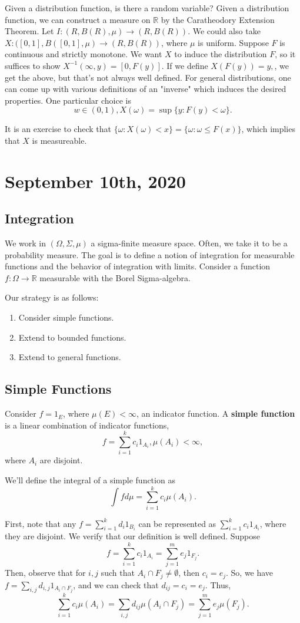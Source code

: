 \documentclass[11pt]{scrartcl}
\newcommand{\R}{\mathbb{R}}
\begin{document}
Given a distribution function, is there a random variable?  Given a distribution function, we can construct a measure on $\R$ by the Caratheodory Extension Theorem.  Let $I: (R, B(R), \mu) \rightarrow (R, B(R))$.  We could also take $X: ([0, 1], B([0, 1], \mu) \rightarrow (R, B(R))$, where $\mu$ is uniform.  Suppose $F$ is continuous and strictly monotone.  We want $X$ to induce the distribution $F$, so it suffices to show $X^{-1}(\infty, y) = [0, F(y)]$.  If we define $X(F(y)) = y,$, we get the above, but that's not always well defined.  For general distributions, one can come up with various definitions of an "inverse" which induces the desired properties.  One particular choice is
$$w \in (0, 1), X(\omega) = \sup\{y : F(y) < \omega\}.$$

It is an exercise to check that $\{\omega: X(\omega) < x\} = \{\omega : \omega \le F(x) \}$, which implies that $X$ is measureable.
\section{September 10th, 2020}
\subsection{Integration}
We work in $(\Omega, \Sigma, \mu)$ a sigma-finite measure space.  Often, we take it to be a probability measure.  The goal is to define a notion of integration for measurable functions and the behavior of integration with limits.  Consider a function $f: \Omega \rightarrow \R$ measurable with the Borel Sigma-algebra.  

Our strategy is as follows:
\begin{enumerate}
\item Consider simple functions.
\item Extend to bounded functions.
\item Extend to general functions.
\end{enumerate}
\subsection{Simple Functions}
\begin{definition} Consider $f = 1_E$, where $\mu(E) < \infty$, an indicator function.  A \textbf{simple function} is a linear combination of indicator functions,
$$f = \sum_{i=1}^k c_i 1_{A_i}, \mu(A_i) < \infty,$$
where $A_i$ are disjoint.  

We'll define the integral of a simple function as 
$$\int f d\mu = \sum_{i=1}^k c_i \mu(A_i).$$
\end{definition}
First, note that any $f = \sum_{i=1}^k d_i 1_{B_i}$ can be represented as $\sum_{i=1}^k c_i 1_{A_i}$, where they are disjoint.  We verify that our definition is well defined.  Suppose
$$f = \sum_{i=1}^k c_i 1_{A_i} = \sum_{j=1}^m e_j 1_{F_j}.$$
Then, observe that for $i, j$ such that $A_i \cap F_j \ne \emptyset$, then $c_i = e_j$.  So, we have $f = \sum_{i, j} d_{i, j} 1_{A_i \cap F_j}$, and we can check that $d_{ij} = c_i = e_j$. 
Thus,
$$\sum_{i=1}^k c_i \mu(A_i) = \sum_{i, j} d_{ij}\mu(A_i \cap F_j) = \sum_{j=1}^m e_j \mu(F_j).$$
\end{document}
